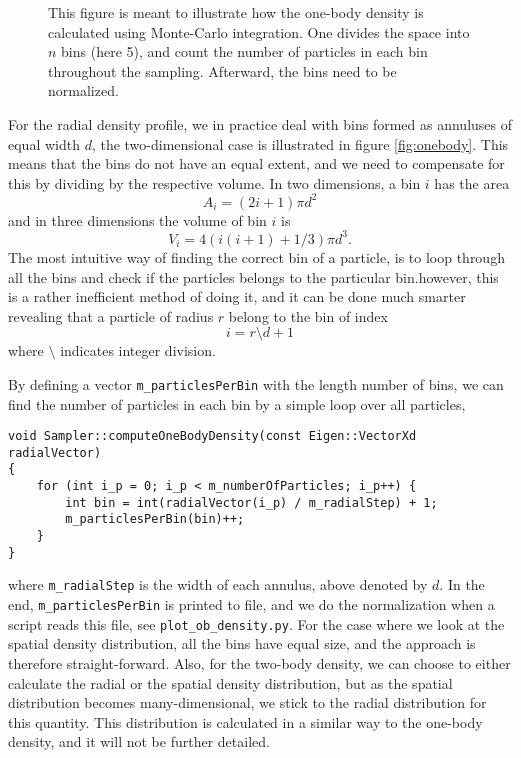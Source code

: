 \begin{figure}
	\centering
	
	\caption{This figure is meant to illustrate how the one-body density is calculated using Monte-Carlo integration. One divides the space into $n$ bins (here 5), and count the number of particles in each bin throughout the sampling. Afterward, the bins need to be normalized.}
	\label{fig:onebody}
\end{figure}
For the radial density profile, we in practice deal with bins formed as annuluses of equal width $d$, the two-dimensional case is illustrated in figure \eqref{fig:onebody}. This means that the bins do not have an equal extent, and we need to compensate for this by dividing by the respective volume. In two dimensions, a bin $i$ has the area
\begin{equation}
A_i=(2i+1)\pi d^2
\end{equation}
and in three dimensions the volume of bin $i$ is
\begin{equation}
V_i=4(i(i+1)+1/3)\pi d^3.
\end{equation}
The most intuitive way of finding the correct bin of a particle, is to loop through all the bins and check if the particles belongs to the particular bin.however, this is a rather inefficient method of doing it, and it can be done much smarter revealing that a particle of radius $r$ belong to the bin of index
\begin{equation}
i=r\setminus d + 1
\end{equation}
where $\setminus$ indicates integer division. 

By defining a vector \lstinline|m_particlesPerBin| with the length number of bins, we can find the number of particles in each bin by a simple loop over all particles,
\begin{lstlisting}
void Sampler::computeOneBodyDensity(const Eigen::VectorXd radialVector)
{
	for (int i_p = 0; i_p < m_numberOfParticles; i_p++) {
		int bin = int(radialVector(i_p) / m_radialStep) + 1;
		m_particlesPerBin(bin)++;
	}
}
\end{lstlisting}
where \lstinline|m_radialStep| is the width of each annulus, above denoted by $d$. In the end, \lstinline|m_particlesPerBin| is printed to file, and we do the normalization when a script reads this file, see \lstinline|plot_ob_density.py|. For the case where we look at the spatial density distribution, all the bins have equal size, and the approach is therefore straight-forward. Also, for the two-body density, we can choose to either calculate the radial or the spatial density distribution, but as the spatial distribution becomes many-dimensional, we stick to the radial distribution for this quantity. This distribution is calculated in a similar way to the one-body density, and it will not be further detailed. 

